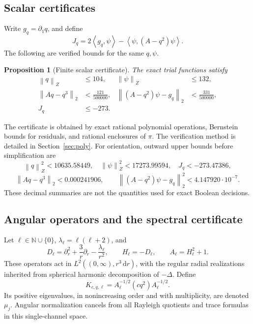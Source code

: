 \documentclass[11pt,a4paper]{article}
\newtheorem{proposition}[theorem]{Proposition}
\theoremstyle{definition}\newtheorem{definition}[theorem]{Definition}
\theoremstyle{remark}\newtheorem{remark}[theorem]{Remark}
\newcommand{\N}{\mathbb N}
\newcommand{\dd}{\,\mathrm d}
\newcommand{\norm}[1]{\left\|#1\right\|}
\newcommand{\ip}[2]{\left\langle #1,#2\right\rangle}
\begin{document}
\subsection{Scalar certificates}
Write \(g_q=\partial_1q\), and define
\begin{equation}\label{eq:Jq}
 J_q=2\ip{g_q}{\psi}-\ip{\psi}{(A-q^2)\psi}.
\end{equation}
The following are verified bounds for the same \(q,\psi\).
\begin{proposition}[Finite scalar certificate]\label{prop:scalar}
The exact trial functions satisfy
\begin{align}
 \norm q_Z&\le104,& \norm\psi_Z&\le132,\label{eq:normcert}\\
 \norm{Aq-q^3}_2&<\frac{121}{500000},&
 \norm{(A-q^2)\psi-g_q}_2&<\frac{331}{500000},\label{eq:rescert}\\
 J_q&\le-273.\label{eq:Jcert}
\end{align}
\end{proposition}
The certificate is obtained by exact rational polynomial operations, Bernstein bounds for residuals, and rational enclosures of \(\pi\). The verification method is detailed in Section~\ref{sec:poly}. For orientation, outward upper bounds before simplification are
\[
 \norm q_Z^2<10635.58449,\quad
 \norm\psi_Z^2<17273.99594,\quad
 J_q<-273.47386,
\]
\[
 \norm{Aq-q^3}_2<0.000241906,\qquad
 \norm{(A-q^2)\psi-g_q}_2^2<4.147920\cdot10^{-7}.
\]
These decimal summaries are not the quantities used for exact Boolean decisions.

\subsection{Angular operators and the spectral certificate}
Let \(\ell\in\N\cup\{0\}\), \(\lambda_\ell=\ell(\ell+2)\), and
\begin{equation}\label{eq:angular}
 D_\ell=\partial_r^2+\frac3r\partial_r-\frac{\lambda_\ell}{r^2},
 \qquad H_\ell=-D_\ell,\qquad A_\ell=H_\ell^2+1.
\end{equation}
These operators act in \(L^2((0,\infty),r^3\dd r)\), with the regular radial realizations inherited from spherical harmonic decomposition of \(-\Delta\). Define
\[
 K_{c,q,\ell}=A_\ell^{-1/2}(c q^2)A_\ell^{-1/2}.
\]
Its positive eigenvalues, in nonincreasing order and with multiplicity, are denoted \(\mu_j\). Angular normalization cancels from all Rayleigh quotients and trace formulas in this single-channel space.
\end{document}
